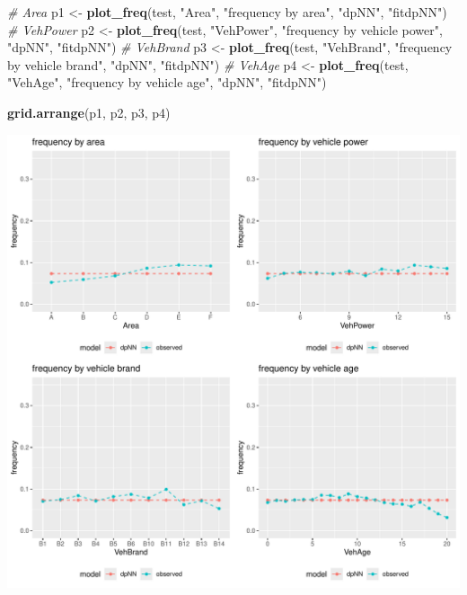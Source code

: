\documentclass[
]{article}
\newenvironment{Shaded}{\begin{snugshade}}{\end{snugshade}}
\newcommand{\CommentTok}[1]{\textcolor[rgb]{0.56,0.35,0.01}{\textit{#1}}}
\newcommand{\FunctionTok}[1]{\textcolor[rgb]{0.13,0.29,0.53}{\textbf{#1}}}
\newcommand{\NormalTok}[1]{#1}
\newcommand{\OtherTok}[1]{\textcolor[rgb]{0.56,0.35,0.01}{#1}}
\newcommand{\StringTok}[1]{\textcolor[rgb]{0.31,0.60,0.02}{#1}}
\begin{document}
\begin{Shaded}
\begin{Highlighting}[]
\CommentTok{\# Area}
\NormalTok{p1 }\OtherTok{\textless{}{-}} \FunctionTok{plot\_freq}\NormalTok{(test, }\StringTok{"Area"}\NormalTok{, }\StringTok{"frequency by area"}\NormalTok{, }\StringTok{"dpNN"}\NormalTok{, }\StringTok{"fitdpNN"}\NormalTok{)}
\CommentTok{\# VehPower}
\NormalTok{p2 }\OtherTok{\textless{}{-}} \FunctionTok{plot\_freq}\NormalTok{(test, }\StringTok{"VehPower"}\NormalTok{, }\StringTok{"frequency by vehicle power"}\NormalTok{, }\StringTok{"dpNN"}\NormalTok{, }\StringTok{"fitdpNN"}\NormalTok{)}
\CommentTok{\# VehBrand}
\NormalTok{p3 }\OtherTok{\textless{}{-}} \FunctionTok{plot\_freq}\NormalTok{(test, }\StringTok{"VehBrand"}\NormalTok{, }\StringTok{"frequency by vehicle brand"}\NormalTok{, }\StringTok{"dpNN"}\NormalTok{, }\StringTok{"fitdpNN"}\NormalTok{)}
\CommentTok{\# VehAge}
\NormalTok{p4 }\OtherTok{\textless{}{-}} \FunctionTok{plot\_freq}\NormalTok{(test, }\StringTok{"VehAge"}\NormalTok{, }\StringTok{"frequency by vehicle age"}\NormalTok{, }\StringTok{"dpNN"}\NormalTok{, }\StringTok{"fitdpNN"}\NormalTok{)}

\FunctionTok{grid.arrange}\NormalTok{(p1, p2, p3, p4)}
\end{Highlighting}
\end{Shaded}

\includegraphics{freMTPLfreq_fnn-zh-cn_files/figure-latex/unnamed-chunk-58-1.pdf}
\end{document}
